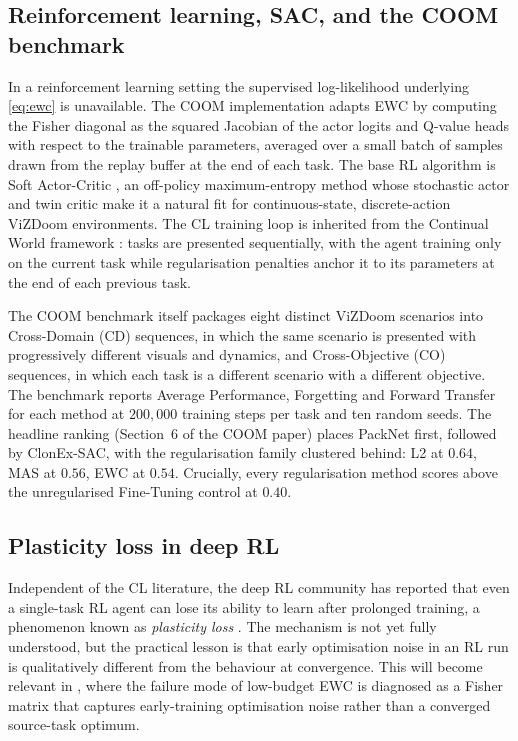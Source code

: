 \subsection{Reinforcement learning, SAC, and the COOM benchmark}

In a reinforcement learning setting the supervised log-likelihood
underlying \cref{eq:ewc} is unavailable. The COOM implementation
adapts EWC by computing the Fisher diagonal as the squared Jacobian
of the actor logits and Q-value heads with respect to the trainable
parameters, averaged over a small batch of samples drawn from the
replay buffer at the end of each task. The base RL algorithm is Soft
Actor-Critic \citep{haarnoja2018sac}, an off-policy maximum-entropy
method whose stochastic actor and twin critic make it a natural fit
for continuous-state, discrete-action ViZDoom environments. The CL
training loop is inherited from the Continual World framework
\citep{wolczyk2021cwsac}: tasks are presented sequentially, with the
agent training only on the current task while regularisation
penalties anchor it to its parameters at the end of each previous
task.

The COOM benchmark itself \citep{tomilin2024coom} packages eight
distinct ViZDoom scenarios into Cross-Domain (CD) sequences, in which
the same scenario is presented with progressively different
visuals and dynamics, and Cross-Objective (CO) sequences, in which
each task is a different scenario with a different objective. The
benchmark reports Average Performance, Forgetting and Forward
Transfer for each method at $200{,}000$ training steps per task and
ten random seeds. The headline ranking (Section~6 of the COOM paper)
places PackNet first, followed by ClonEx-SAC, with the
regularisation family clustered behind: L2 at $0.64$, MAS at $0.56$,
EWC at $0.54$. Crucially, every regularisation method scores above
the unregularised Fine-Tuning control at $0.40$.

\subsection{Plasticity loss in deep RL}

Independent of the CL literature, the deep RL community has reported
that even a single-task RL agent can lose its ability to learn after
prolonged training, a phenomenon known as \emph{plasticity loss}
\citep{lyle2022plasticity, nikishin2022primacy}. The mechanism is
not yet fully understood, but the practical lesson is that early
optimisation noise in an RL run is qualitatively different from the
behaviour at convergence. This will become relevant in
, where the failure mode of low-budget EWC is
diagnosed as a Fisher matrix that captures early-training
optimisation noise rather than a converged source-task optimum.

